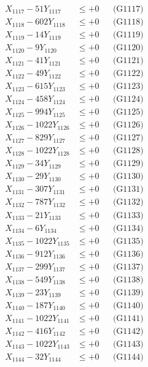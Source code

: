 \documentclass[a4paper,10pt]{article}
\begin{document}
{\begin{align}
X_{1117} - 51Y_{1117} &\leq +0 && \text{(G1117)} \\
X_{1118} - 602Y_{1118} &\leq +0 && \text{(G1118)} \\
X_{1119} - 14Y_{1119} &\leq +0 && \text{(G1119)} \\
X_{1120} - 9Y_{1120} &\leq +0 && \text{(G1120)} \\
\allowbreak
X_{1121} - 41Y_{1121} &\leq +0 && \text{(G1121)} \\
X_{1122} - 49Y_{1122} &\leq +0 && \text{(G1122)} \\
X_{1123} - 615Y_{1123} &\leq +0 && \text{(G1123)} \\
X_{1124} - 458Y_{1124} &\leq +0 && \text{(G1124)} \\
X_{1125} - 994Y_{1125} &\leq +0 && \text{(G1125)} \\
X_{1126} - 1022Y_{1126} &\leq +0 && \text{(G1126)} \\
X_{1127} - 829Y_{1127} &\leq +0 && \text{(G1127)} \\
X_{1128} - 1022Y_{1128} &\leq +0 && \text{(G1128)} \\
X_{1129} - 34Y_{1129} &\leq +0 && \text{(G1129)} \\
X_{1130} - 29Y_{1130} &\leq +0 && \text{(G1130)} \\
\allowbreak
X_{1131} - 307Y_{1131} &\leq +0 && \text{(G1131)} \\
X_{1132} - 787Y_{1132} &\leq +0 && \text{(G1132)} \\
X_{1133} - 21Y_{1133} &\leq +0 && \text{(G1133)} \\
X_{1134} - 6Y_{1134} &\leq +0 && \text{(G1134)} \\
X_{1135} - 1022Y_{1135} &\leq +0 && \text{(G1135)} \\
X_{1136} - 912Y_{1136} &\leq +0 && \text{(G1136)} \\
X_{1137} - 299Y_{1137} &\leq +0 && \text{(G1137)} \\
X_{1138} - 549Y_{1138} &\leq +0 && \text{(G1138)} \\
X_{1139} - 23Y_{1139} &\leq +0 && \text{(G1139)} \\
X_{1140} - 187Y_{1140} &\leq +0 && \text{(G1140)} \\
\allowbreak
X_{1141} - 1022Y_{1141} &\leq +0 && \text{(G1141)} \\
X_{1142} - 416Y_{1142} &\leq +0 && \text{(G1142)} \\
X_{1143} - 1022Y_{1143} &\leq +0 && \text{(G1143)} \\
X_{1144} - 32Y_{1144} &\leq +0 && \text{(G1144)} \\

\end{align}}
\end{document}
